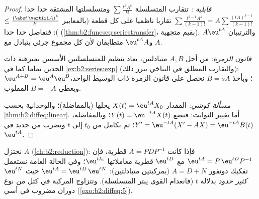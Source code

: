 \begin{proof}
\emph{قابلية :} تتقارب المتسلسلة $\sum \frac{t^kA^k}{k!}$ ومتسلسلتها المشتقة
حدا حدا $\sum \frac{t^{k-1}A^k}{(k-1)!} = A\sum
\frac{(tA)^{k-1}}{(k-1)!}$ تقاربا ناظميا على كل قطعة (بالمعايير $\leq \frac{(\abs t\,\vertiii A)^k}{k!}$): فنفاضل
حدا حدا (\cref{thm:b2:funcseq:seriestransfer}، بقيم متجهية).
والترتيبان $A\eu^{tA}$ و$\eu^{tA}A$ متطابقان لأن كل مجموع جزئي يتبادل مع
$A$.

\emph{قانون الزمرة:} من أجل $A, B$ متبادلتين، يعاد تنظيم 
للمتسلسلتين الأسيتين بمبرهنة ذات الحدين تماما كما في \cref{ex:b2:series:exp} (والتقارب
المطلق في  البناخي يبرر ذلك): $\eu^{A+B} = \eu^A\eu^B$؛ وبأخذ $B = sA$ نحصل على
قانون الزمرة ذات الوسيط الواحد، ويعطي $B = -A$ المقلوب.

\emph{مسألة كوشي:} المقدار $X(t) = \eu^{tA}X_0$ يحلها (بالمفاضلة)؛ والوحدانية
بحسب \cref{thm:b2:diffeq:linear}. أما تغيير الثوابت: فنضع $Y(t) = \eu^{-tA}X(t)$؛ وبالمفاضلة، $Y' = \eu^{-tA}(X' -
AX) = \eu^{-tA}B(t)$؛ ثم
نكامل من $t_0$ إلى $t$ ونضرب من جديد في $\eu^{tA}$.
\end{proof}

\begin{method}[حساب $\eu^{tA}$]\label{met:b2:diffeq:computeexp}
نختزل $A$ (\cref{ch:b2:reduction}): فإذا كانت $A = PDP^{-1}$ قطرية، فإن
$\eu^{tA} = P\,\eu^{tD}P^{-1}$ مع $\eu^{tD}$ قطرية معاملاتها $\eu^{t\lambda_i}$؛ وفي الحالة العامة نستعمل
تفكيك دونفور $A = D + N$ (بمركبتين متبادلتين): $\eu^{tA} = \eu^{tD}\,\eu^{tN}$ حيث $\eu^{tN}$ \emph{كثير
حدود} بدلالة $t$ (فانعدام القوى يبتر المتسلسلة). وتتزاوج  المركبة في كتل من نوع دوران مضروب في أسي
(\cref{exo:b2:diffeq:5}).
\end{method}

